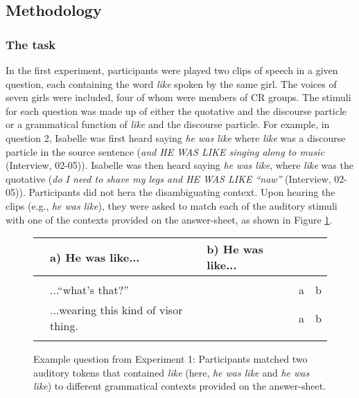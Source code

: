 \subsection{Methodology}

\subsubsection{The task}

In the first experiment, participants were played two clips of speech in a given question, each containing the word \textit{like} spoken by the same girl.  The voices of seven girls were included, four of whom were members of CR groups.  The stimuli for each question was made up of either the quotative and the discourse particle or a grammatical function of \textit{like} and the discourse particle.  For example, in question 2, Isabelle was first heard saying \textit{he was like} where \textit{like} was a discourse particle in the source sentence (\textit{and HE WAS LIKE singing along to music} (Interview, 02-05)).  Isabelle was then heard saying \textit{he was like}, where \textit{like} was the quotative (\textit{do I need to shave my legs and HE WAS LIKE ``naw''} (Interview, 02-05)).  Participants did not hera the disambiguating context.  Upon hearing the clips (e.g., \textit{he was like}), they were asked to match each of the auditory stimuli with one of the contexts provided on the answer-sheet, as shown in Figure \ref{ExampleExp1}.  


\begin{figure}[ht]
 \begin{center}
\caption{Example question from Experiment 1: Participants matched two auditory tokens that contained \textit{like} (here, \textit{he was like} and \textit{he was like}) to different grammatical contexts provided on the answer-sheet.}\label{ExampleExp1} 

		\begin{tabular}{lllrr}\hline

 
  & a) He was like...	&	b) He was like... & \\
	\hline
	\\
  & ...``what's that?'' 	&		&a	&b  \\

                    &...wearing this kind of visor thing.	& &a	&b  \\
                    \\	
		\hline
		\end{tabular}
	
	\end{center}
\end{figure}


